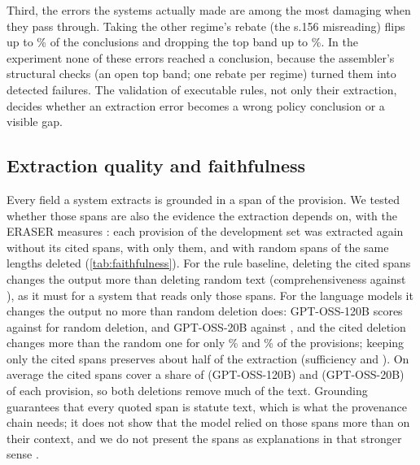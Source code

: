 \documentclass[sn-apa]{sn-jnl}
\begin{document}
Third, the errors the systems actually made are among the most damaging
when they pass through. Taking the other regime's rebate (the s.156
misreading) flips up to \% of the
conclusions and dropping the top band up to
\%. In the experiment none of these errors
reached a conclusion, because the assembler's structural checks (an open
top band; one rebate per regime) turned them into detected failures. The
validation of executable rules, not only their extraction, decides whether
an extraction error becomes a wrong policy conclusion or a visible gap.

\subsection{Extraction quality and faithfulness}

Every field a system extracts is grounded in a span of the provision. We
tested whether those spans are also the evidence the extraction depends on,
with the ERASER measures \citep{deyoung2020eraser}: each provision of the
development set was extracted again without its cited spans, with only
them, and with random spans of the same lengths deleted
(\cref{tab:faithfulness}). For the rule baseline, deleting the cited spans
changes the output more than deleting random text (comprehensiveness
 against
), as it must for a system
that reads only those spans. For the language models it changes the
output no more than random deletion does:
GPT-OSS-120B scores  against
 for random deletion,
and GPT-OSS-20B  against
, and the cited deletion
changes more than the random one for only
\% and
\% of the provisions; keeping only the cited
spans preserves about half of the extraction (sufficiency
 and
). On average the cited spans cover a
share of  (GPT-OSS-120B) and
 (GPT-OSS-20B) of each provision,
so both deletions remove much of the text. Grounding guarantees that every quoted
span is statute text, which is what the provenance chain needs; it does not
show that the model relied on those spans more than on their context, and we
do not present the spans as explanations in that stronger sense
\citep{jacovi2020faithful}.
\end{document}
